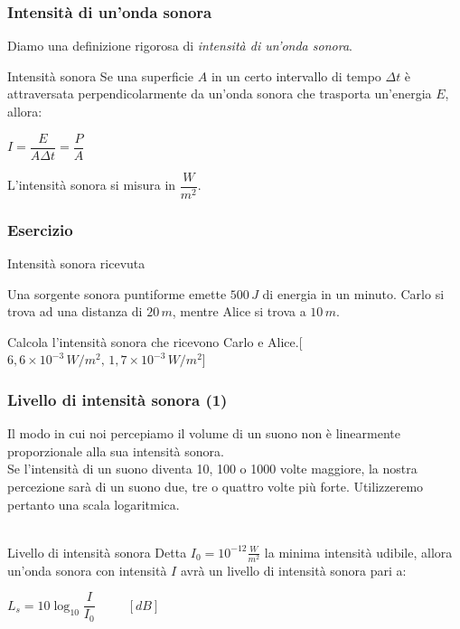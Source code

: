 \documentclass[]{beamer}
\theoremstyle{plain}
\begin{document}
\begin{frame}
\frametitle{Intensità di un'onda sonora}
Diamo una definizione rigorosa di \emph{intensità di un'onda sonora}.
\begin{block}{Intensità sonora}
Se una superficie $ A $ in un certo intervallo di tempo $ \Delta t $ è attraversata perpendicolarmente da un'onda sonora che trasporta un'energia $ E $, allora:
\begin{center}
\colorbox{blue!30}{$ I = \dfrac{E}{A\Delta t} = \dfrac{P}{A}$}
\end{center}
L'intensità sonora si misura in $ \dfrac{W}{m^2} $.
\end{block}
\end{frame}



\begin{frame}
\frametitle{Esercizio}
\begin{exampleblock}{Intensità sonora ricevuta}
\small{Una sorgente sonora puntiforme emette $ 500 \, J $ di energia in un minuto. Carlo si trova ad una distanza di $ 20 \, m $, mentre Alice si trova a $ 10 \, m $.

Calcola l'intensità sonora che ricevono Carlo e Alice.\hspace*{\fill}[$ 6,6 \times 10^{-3} \, W/m^2, \, 1,7 \times 10^{-3} \, W/m^2 $]}
\end{exampleblock}
\end{frame}



\begin{frame}
\frametitle{Livello di intensità sonora (1)}
Il modo in cui noi percepiamo il volume di un suono non è linearmente proporzionale alla sua intensità sonora.\pause\\


Se l'intensità di un suono diventa \alert<2>{10, 100 o 1000 volte maggiore}, la nostra percezione sarà di un suono \alert<2>{due, tre o quattro volte più forte}. Utilizzeremo pertanto una scala logaritmica.\\~\pause
\begin{block}{Livello di intensità sonora}
Detta $ I_0 = 10^{-12} \frac{W}{m^2} $ la minima intensità udibile, allora un'onda sonora con intensità $ I $ avrà un livello di intensità sonora pari a:
\begin{center}
\colorbox{blue!30}{$ L_s = 10 \log_{10} \dfrac{I}{I_0} $}~~~~~$ \left[ dB \right] $
\end{center}
\end{block}
\end{frame}
\end{document}
